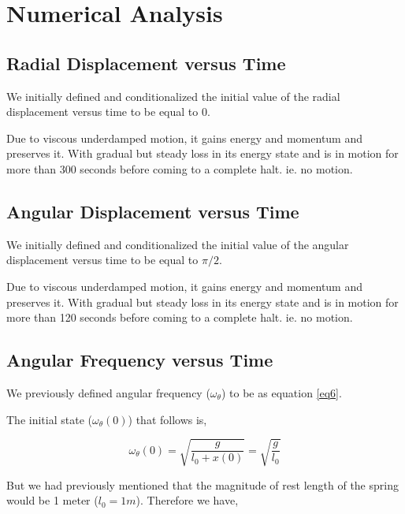 \section{{Numerical Analysis}}
        
    \subsection{{Radial Displacement versus Time}}
            
                {We initially defined and conditionalized the initial value of the radial displacement versus time to be equal to 0.}
                
                {Due to viscous underdamped motion, it gains energy and momentum and preserves it. With gradual but steady loss in its energy state and is in motion for more than 300 seconds before coming to a complete halt. ie. no motion.}
    
    \subsection{{Angular Displacement versus Time}}
            
                {We initially defined and conditionalized the initial value of the angular displacement versus time to be equal to $\pi/2$.}
                
                {Due to viscous underdamped motion, it gains energy and momentum and preserves it. With gradual but steady loss in its energy state and is in motion for more than 120 seconds before coming to a complete halt. ie. no motion.}
    
                
    \subsection{{Angular Frequency versus Time}}
                
                {We previously defined angular frequency ($\omega_\theta$) to be as equation \ref{eq6}.}
                
                {The initial state ($\omega_\theta(0)$) that follows is,}
                
                $$\omega_\theta(0) = \sqrt{\frac{g}{l_0 + x(0)}} = \sqrt{\frac{g}{l_0}}$$
                
                {But we had previously mentioned that the magnitude of rest length of the spring would be 1 meter ($l_0 = 1 m$). Therefore we have,}
                
